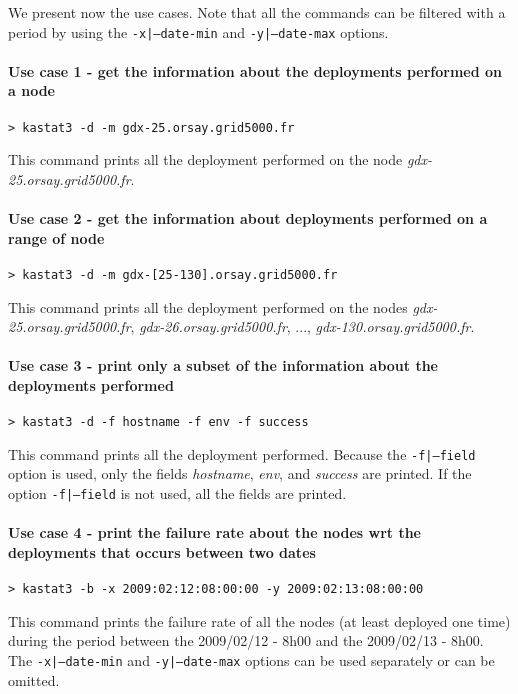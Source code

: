\documentclass[a4wide,10pt,oneside]{book}
\begin{document}
We present now the use cases. Note that all the commands can be filtered with a period by using the \texttt{-x|--date-min} and \texttt{-y|--date-max} options.
\paragraph{Use case 1 - get the information about the deployments performed on a node}
\begin{verbatim}
> kastat3 -d -m gdx-25.orsay.grid5000.fr
\end{verbatim}
This command prints all the deployment performed on the node \textit{gdx-25.orsay.grid5000.fr}.

\paragraph{Use case 2 - get the information about deployments performed on a range of node}
\begin{verbatim}
> kastat3 -d -m gdx-[25-130].orsay.grid5000.fr
\end{verbatim}
This command prints all the deployment performed on the nodes \textit{gdx-25.orsay.grid5000.fr}, \textit{gdx-26.orsay.grid5000.fr}, ..., \textit{gdx-130.orsay.grid5000.fr}.

\paragraph{Use case 3 - print only a subset of the information about the deployments performed}
\begin{verbatim}
> kastat3 -d -f hostname -f env -f success
\end{verbatim}
This command prints all the deployment performed. Because the \texttt{-f|--field} option is used, only the fields \textit{hostname}, \textit{env}, and \textit{success} are printed. If the option \texttt{-f|--field} is not used, all the fields are printed.

\paragraph{Use case 4 - print the failure rate about the nodes wrt the deployments that occurs between two dates}
\begin{verbatim}
> kastat3 -b -x 2009:02:12:08:00:00 -y 2009:02:13:08:00:00
\end{verbatim}
This command prints the failure rate of all the nodes (at least deployed one time) during the period between the 2009/02/12 - 8h00 and the 2009/02/13 - 8h00. The \texttt{-x|--date-min} and \texttt{-y|--date-max} options can be used separately or can be omitted.
\end{document}
